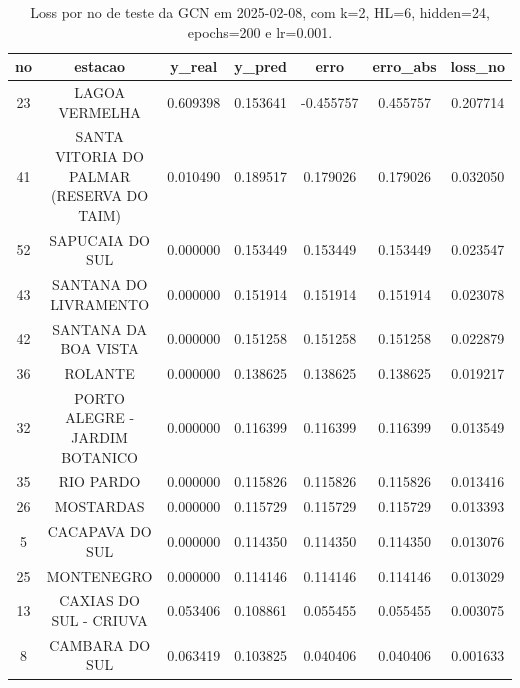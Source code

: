 \begin{table}[h]
\centering
\caption{Loss por no de teste da GCN em 2025-02-08, com k=2, HL=6, hidden=24, epochs=200 e lr=0.001.}
\label{tab:gcn_loss_k2_hl6_h24_e200_d20250208}
\begin{tabular}{ccccccc}
\toprule
no & estacao & y\_real & y\_pred & erro & erro\_abs & loss\_no \\
\midrule
23 & LAGOA VERMELHA & 0.609398 & 0.153641 & -0.455757 & 0.455757 & 0.207714 \\
41 & SANTA VITORIA DO PALMAR (RESERVA DO TAIM) & 0.010490 & 0.189517 & 0.179026 & 0.179026 & 0.032050 \\
52 & SAPUCAIA DO SUL & 0.000000 & 0.153449 & 0.153449 & 0.153449 & 0.023547 \\
43 & SANTANA DO LIVRAMENTO & 0.000000 & 0.151914 & 0.151914 & 0.151914 & 0.023078 \\
42 & SANTANA DA BOA VISTA & 0.000000 & 0.151258 & 0.151258 & 0.151258 & 0.022879 \\
36 & ROLANTE & 0.000000 & 0.138625 & 0.138625 & 0.138625 & 0.019217 \\
32 & PORTO ALEGRE - JARDIM BOTANICO & 0.000000 & 0.116399 & 0.116399 & 0.116399 & 0.013549 \\
35 & RIO PARDO & 0.000000 & 0.115826 & 0.115826 & 0.115826 & 0.013416 \\
26 & MOSTARDAS & 0.000000 & 0.115729 & 0.115729 & 0.115729 & 0.013393 \\
5 & CACAPAVA DO SUL & 0.000000 & 0.114350 & 0.114350 & 0.114350 & 0.013076 \\
25 & MONTENEGRO & 0.000000 & 0.114146 & 0.114146 & 0.114146 & 0.013029 \\
13 & CAXIAS DO SUL - CRIUVA & 0.053406 & 0.108861 & 0.055455 & 0.055455 & 0.003075 \\
8 & CAMBARA DO SUL & 0.063419 & 0.103825 & 0.040406 & 0.040406 & 0.001633 \\
\bottomrule
\end{tabular}
\end{table}
